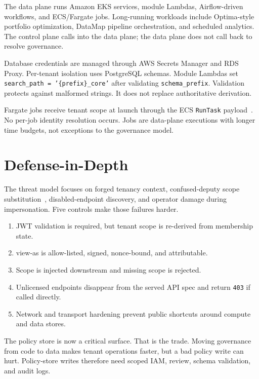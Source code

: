 \documentclass[10pt,journal]{IEEEtran}
\newcommand{\viewas}{view-as}
\newcommand{\code}[1]{{\small\texttt{\textcolor{causifyblue}{#1}}}}
\begin{document}
The data plane runs Amazon EKS services, module Lambdas, Airflow-driven workflows, and ECS/Fargate jobs. Long-running workloads include Optima-style portfolio optimization, DataMap pipeline orchestration, and scheduled analytics. The control plane calls into the data plane; the data plane does not call back to resolve governance.

Database credentials are managed through AWS Secrets Manager and RDS Proxy. Per-tenant isolation uses PostgreSQL schemas. Module Lambdas set \code{search\_path = '\{prefix\}\_core'} after validating \code{schema\_prefix}. Validation protects against malformed strings. It does not replace authoritative derivation.

Fargate jobs receive tenant scope at launch through the ECS \code{RunTask} payload~\cite{ecs_runtask}. No per-job identity resolution occurs. Jobs are data-plane executions with longer time budgets, not exceptions to the governance model.

\section{Defense-in-Depth}

The threat model focuses on forged tenancy context, confused-deputy scope substitution~\cite{confused_deputy}, disabled-endpoint discovery, and operator damage during impersonation. Five controls make those failures harder.

\begin{enumerate}[leftmargin=1.2em, topsep=2pt, itemsep=2pt, parsep=0pt]
  \item JWT validation is required, but tenant scope is re-derived from membership state.
  \item \viewas{} is allow-listed, signed, nonce-bound, and attributable.
  \item Scope is injected downstream and missing scope is rejected.
  \item Unlicensed endpoints disappear from the served API spec and return \code{403} if called directly.
  \item Network and transport hardening prevent public shortcuts around compute and data stores.
\end{enumerate}

The policy store is now a critical surface. That is the trade. Moving governance from code to data makes tenant operations faster, but a bad policy write can hurt. Policy-store writes therefore need scoped IAM, review, schema validation, and audit logs.
\end{document}
